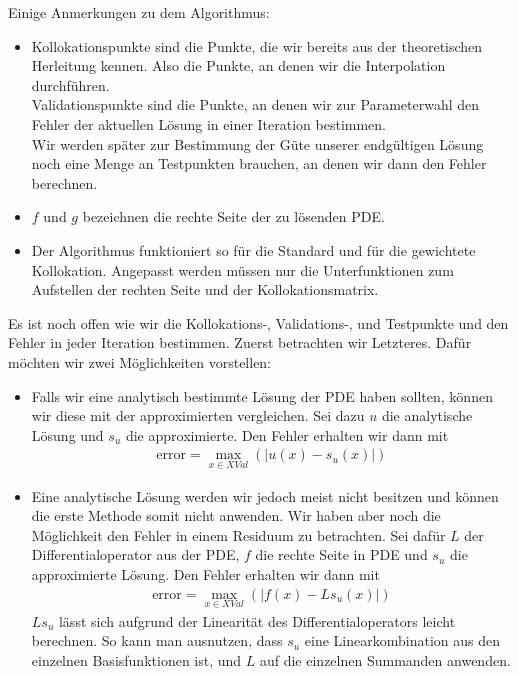 Einige Anmerkungen zu dem Algorithmus:
\begin{itemize}
\item
Kollokationspunkte sind die Punkte, die wir bereits aus der theoretischen Herleitung kennen. Also die Punkte, an denen wir die Interpolation durchführen.\\
Validationspunkte sind die Punkte, an denen wir zur Parameterwahl den Fehler der aktuellen Lösung in einer Iteration bestimmen.\\
Wir werden später zur Bestimmung der Güte unserer endgültigen Lösung noch eine Menge an Testpunkten brauchen, an denen wir dann den Fehler berechnen.
\item
$f$ und $g$ bezeichnen die rechte Seite der zu lösenden \gls{PDE}.
\item
Der Algorithmus funktioniert so für die Standard und für die gewichtete Kollokation. Angepasst werden müssen nur die Unterfunktionen zum Aufstellen der rechten Seite und der Kollokationsmatrix.
\end{itemize}
Es ist noch offen wie wir die Kollokations-, Validations-, und Testpunkte und den Fehler in jeder Iteration bestimmen. Zuerst betrachten wir Letzteres. Dafür möchten wir zwei Möglichkeiten vorstellen:
\begin{itemize}
\item
Falls wir eine analytisch bestimmte Lösung der \gls{PDE} haben sollten, können wir diese mit der approximierten vergleichen. Sei dazu $u$ die analytische Lösung und $s_u$ die approximierte. Den Fehler erhalten wir dann mit
\begin{align*}
\mathrm{error} = \max_{x \in XVal} \left(\left| u(x) - s_u(x) \right| \right)
\end{align*}
\item
Eine analytische Lösung werden wir jedoch meist nicht besitzen und können die erste Methode somit nicht anwenden. Wir haben aber noch die Möglichkeit den Fehler in einem Residuum zu betrachten. Sei dafür $L$ der Differentialoperator aus der \gls{PDE}, $f$ die rechte Seite in \gls{PDE} und $s_u$ die approximierte Lösung. Den Fehler erhalten wir dann mit
\begin{align*}
\mathrm{error} = \max_{x \in XVal} \left(\left| f(x) - L s_u(x) \right| \right)
\end{align*}
$Ls_u$ lässt sich aufgrund der Linearität des Differentialoperators leicht berechnen. So kann man ausnutzen, dass $s_u$ eine Linearkombination aus den einzelnen Basisfunktionen ist, und $L$ auf die einzelnen Summanden anwenden.
\end{itemize}

